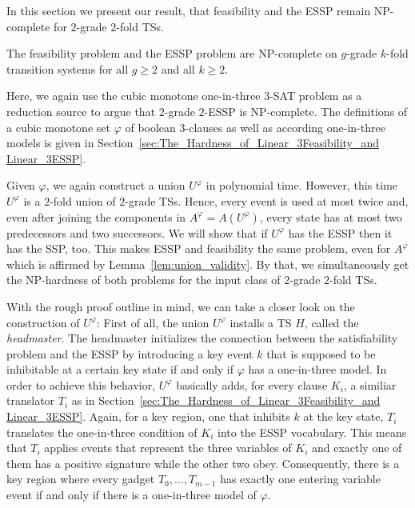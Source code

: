 \documentclass[english]{lipics_hacked}
\begin{document}
In this section we present our result, that feasibility and the ESSP remain NP-complete for $2$-grade $2$-fold TSs.
%
\begin{theorem}
\label{thm:twograde_twofold_NPcompleteness}
The feasibility problem and the ESSP problem are NP-complete on $g$-grade $k$-fold transition systems for all $g \geq 2$ and all $k \geq 2$.
\end{theorem}
%
Here, we again use the cubic monotone one-in-three $3$-SAT problem as a reduction source to argue that $2$-grade $2$-ESSP is NP-complete.
The definitions of a cubic monotone set $\varphi$ of boolean $3$-clauses as well as according one-in-three models is given in Section~\ref{sec:The_Hardness_of_Linear_3Feasibility_and Linear_3ESSP}.

Given $\varphi$, we again construct a union $U^{\varphi}$ in polynomial time.
However, this time $U^{\varphi}$ is a $2$-fold union of $2$-grade TSs.
Hence, every event is used at most twice and, even after joining the components in $A^{\varphi} = A(U^\varphi)$, every state has at most two predecessors and two successors.
We will show that if $U^{\varphi}$ has the ESSP then it has the SSP, too.
This makes ESSP and feasibility the same problem, even for $A^{\varphi}$ which is affirmed by Lemma~\ref{lem:union_validity}.
By that, we simultaneously get the NP-hardness of both problems for the input class of $2$-grade $2$-fold TSs.

With the rough proof outline in mind, we can take a closer look on the construction of $U^{\varphi}$:
First of all, the union $U^{\varphi}$ installs a TS $H$, called the \emph{headmaster}.
The headmaster initializes the connection between the satisfiability problem and the ESSP by introducing a key event $k$ that is supposed to be inhibitable at a certain key state if and only if $\varphi$ has a one-in-three model.
In order to achieve this behavior, $U^{\varphi}$ basically adds, for every clause $K_i$, a similiar translator $T_i$ as in Section~\ref{sec:The_Hardness_of_Linear_3Feasibility_and Linear_3ESSP}.
Again, for a key region, one that inhibits $k$ at the key state, $T_i$ translates the one-in-three condition of $K_i$ into the ESSP vocabulary.
This means that $T_i$ applies events that represent the three variables of $K_i$ and exactly one of them has a positive signature while the other two obey.
Consequently, there is a key region where every gadget $T_0, \dots, T_{m-1}$ has exactly one entering variable event if and only if there is a one-in-three model of $\varphi$.
\end{document}
